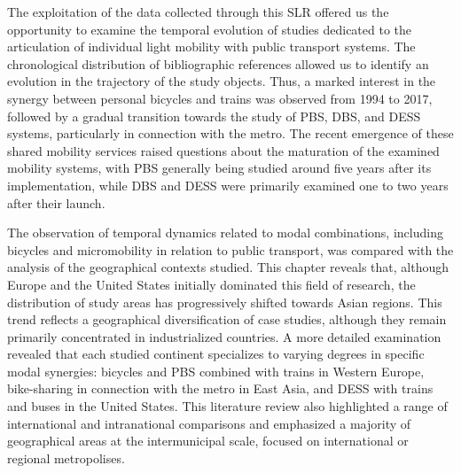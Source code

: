 \begin{refsegment}
The exploitation of the data collected through this \acrshort{SLR} offered us the opportunity to examine the temporal evolution of studies dedicated to the articulation of individual light mobility with public transport systems. The chronological distribution of bibliographic references allowed us to identify an evolution in the trajectory of the study objects. Thus, a marked interest in the synergy between personal bicycles and trains was observed from 1994 to 2017, followed by a gradual transition towards the study of \acrshort{PBS}, \acrshort{DBS}, and \acrshort{DESS} systems, particularly in connection with the metro. The recent emergence of these shared mobility services raised questions about the maturation of the examined mobility systems, with \acrshort{PBS} generally being studied around five years after its implementation, while \acrshort{DBS} and \acrshort{DESS} were primarily examined one to two years after their launch.%

The observation of temporal dynamics related to modal combinations, including bicycles and micromobility in relation to public transport, was compared with the analysis of the geographical contexts studied. This chapter reveals that, although Europe and the United States initially dominated this field of research, the distribution of study areas has progressively shifted towards Asian regions. This trend reflects a geographical diversification of case studies, although they remain primarily concentrated in industrialized countries. A more detailed examination revealed that each studied continent specializes to varying degrees in specific modal synergies: bicycles and \acrshort{PBS} combined with trains in Western Europe, bike-sharing in connection with the metro in East Asia, and \acrshort{DESS} with trains and buses in the United States. This literature review also highlighted a range of international and intranational comparisons and emphasized a majority of geographical areas at the intermunicipal scale, focused on international or regional metropolises.%


\end{refsegment}
